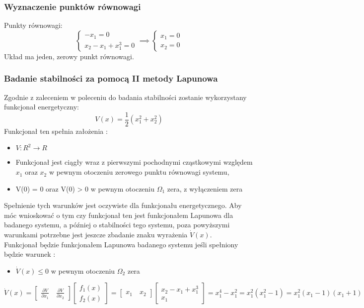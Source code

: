 \documentclass[a4paper,11pt]{article}
\begin{document}
\subsubsection{Wyznaczenie punktów równowagi}
Punkty równowagi: \\
\begin{equation*}
\begin{cases}
-x_{1}=0 \\
x_{2}-x_{1}+x_{1}^{3}=0
\end{cases} \implies
\begin{cases}
x_{1}=0 \\
x_{2}=0
\end{cases}
\end{equation*}
Układ ma jeden, zerowy punkt równowagi.

\subsubsection{Badanie stabilności za pomocą II metody Lapunowa}
Zgodnie z zaleceniem w poleceniu do badania stabilności zostanie wykorzystany funkcjonał energetyczny:
\begin{equation*}
V(x)=\frac{1}{2}(x_{1}^{2}+x_{2}^{2})
\end{equation*}
Funkcjonał ten spełnia założenia :
\begin{itemize}
\item \( V : R^{2} \rightarrow R \)
\item Funkcjonał jest ciągły wraz z pierwszymi pochodnymi cząstkowymi względem \(x_{1}\) oraz \(x_{2}\) w pewnym otoczeniu zerowego punktu równowagi systemu, 
\item V(0) = 0 oraz V(0) > 0 w pewnym otoczeniu \(\Omega_{1}\) zera, z wyłączeniem zera 
\end{itemize}
Spełnienie tych warunków jest oczywiste dla funkcjonału energetycznego. Aby móc wnioskować o tym czy funkcjonał ten jest funkcjonałem Lapunowa dla badanego systemu, a później o stabilności tego systemu, poza powyższymi warunkami potrzebne jest jeszcze zbadanie znaku wyrażenia \( \dot{V}(x) \). \\ Funkcjonał będzie funkcjonałem Lapunowa badanego systemu jeśli spełniony będzie warunek :
\begin{itemize}
\item \( \dot{V}(x)\leq 0 \) w pewnym otoczeniu \( \Omega_{2}\) zera
\end{itemize} 
\begin{equation*}
\dot{V}(x)=
\begin{bmatrix}
\frac{\partial V}{\partial x_{1}} \quad
\frac{\partial V}{\partial x_{2}} 
\end{bmatrix}
\begin{bmatrix}
f_{1}(x) \\
f_{2}(x)
\end{bmatrix}=
\begin{bmatrix}
x_{1} \quad
x_{2}
\end{bmatrix}
\begin{bmatrix}
x_{2}-x_{1}+x_{1}^{3} \\ 
x_{1}
\end{bmatrix}=
x_{1}^{4}-x_{1}^{2}
=x_{1}^{2}(x_{1}^{2}-1)=
x_{1}^{2}(x_{1}-1)(x_{1}+1)
\end{equation*}
\end{document}
